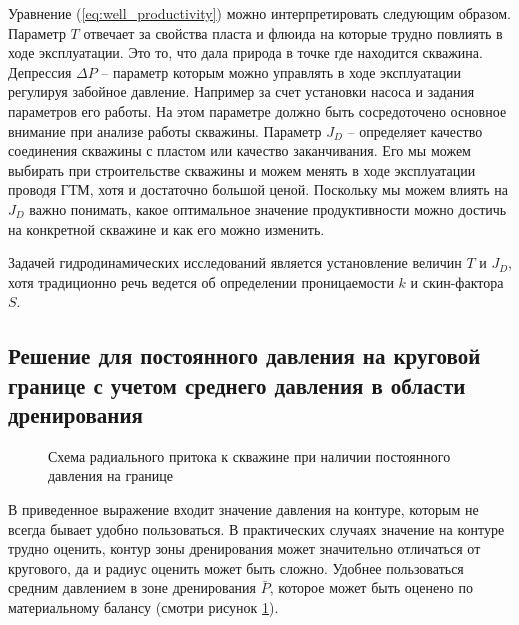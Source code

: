 Уравнение (\ref{eq:well_productivity}) можно интерпретировать следующим образом. Параметр $T$ отвечает за свойства пласта и флюида на которые трудно повлиять в ходе эксплуатации. Это то, что дала природа в точке где находится скважина. Депрессия $\Delta P$ -- параметр которым можно управлять в ходе эксплуатации регулируя забойное давление. Например за счет установки насоса и задания параметров его работы. На этом параметре должно быть сосредоточено основное внимание при анализе работы скважины. Параметр $J_D$ -- определяет качество соединения скважины с пластом или качество заканчивания. Его мы можем выбирать при строительстве скважины и можем менять в ходе эксплуатации проводя ГТМ, хотя и достаточно большой ценой. Поскольку мы можем влиять на $J_D$ важно понимать, какое оптимальное значение продуктивности можно достичь на конкретной скважине и как его можно изменить. 

Задачей гидродинамических исследований является установление величин $T$ и $J_D$, хотя традиционно речь ведется об определении проницаемости $k$ и скин-фактора $S$. 




\subsection{Решение для постоянного давления на круговой границе с учетом среднего давления в области дренирования}

\begin{figure}[h!]
	\begin{center}
		
		\caption{Схема радиального притока к скважине при наличии постоянного давления на границе}
		\label{ris:radial_inflow_steady_state_average_pressure}
	\end{center}
\end{figure}

В приведенное выражение входит значение давления на контуре, которым не всегда бывает удобно пользоваться. В практических случаях значение на контуре трудно оценить, контур зоны дренирования может значительно отличаться от кругового, да и радиус оценить может быть сложно. Удобнее пользоваться средним давлением в зоне дренирования $\bar{P}$, которое может быть оценено по материальному балансу (смотри рисунок \ref{ris:radial_inflow_steady_state_average_pressure}). 



